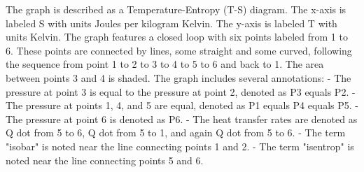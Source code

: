 The graph is described as a Temperature-Entropy (T-S) diagram. The x-axis is labeled S with units Joules per kilogram Kelvin. The y-axis is labeled T with units Kelvin. The graph features a closed loop with six points labeled from 1 to 6. These points are connected by lines, some straight and some curved, following the sequence from point 1 to 2 to 3 to 4 to 5 to 6 and back to 1. The area between points 3 and 4 is shaded. The graph includes several annotations:
- The pressure at point 3 is equal to the pressure at point 2, denoted as P3 equals P2.
- The pressure at points 1, 4, and 5 are equal, denoted as P1 equals P4 equals P5.
- The pressure at point 6 is denoted as P6.
- The heat transfer rates are denoted as Q dot from 5 to 6, Q dot from 5 to 1, and again Q dot from 5 to 6.
- The term "isobar" is noted near the line connecting points 1 and 2.
- The term "isentrop" is noted near the line connecting points 5 and 6.